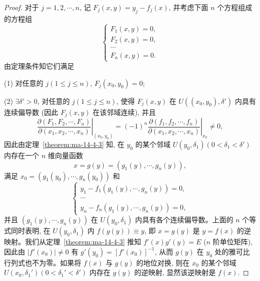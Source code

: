 \begin{proof}
对于 $j=1,2,\cdots,n$, 记 $F_j(x,y)=y_j-f_j(x)$, 并考虑下面 $n$ 个方程组成的方程组
\[
  \begin{cases}
    F_1(x,y)=0,\\
    F_2(x,y)=0,\\
    \cdots\\
    F_n(x,y)=0.
  \end{cases}
\]
由定理条件知它们满足

\noindent (1) 对任意的 $j(1\leqslant j\leqslant n)$, $F_j(x_0,y_0)=0$;

\noindent (2) $\exists\delta'>0$, 对任意的 $j(1\leqslant j\leqslant n)$, 使得 $F_j(x,y)$ 在 $U((x_0,y_0),\delta')$ 内具有连续偏导数 (因此 $F_j(x,y)$ 在该邻域连续), 并且
\[
  \left.
  \frac{\partial(F_1,F_2,\cdots,F_n)}
       {\partial(x_1,x_2,\cdots,x_n)}
  \right|_{(x_0,y_0)}
  =
  (-1)^n
  \left.
  \frac{\partial(f_1,f_2,\cdots,f_n)}
       {\partial(x_1,x_2,\cdots,x_n)}
  \right|_{x_0}
  \ne0,
\]
因此由定理~\ref{theorem:ma-14-4-3} 知, 在 $y_0$ 的某个邻域 $U(y_0,\delta_1)(0<\delta_1<\delta')$ 内存在一个 $n$ 维向量函数
\[
  x=g(y)=(g_1(y),\cdots,g_n(y)),
\]
满足 $x_0=(g_1(y_0),\cdots,g_n(y_0))$ 和
\[
  \begin{cases}
    y_1-f_1(g_1(y),\cdots,g_n(y))=0,\\
    \cdots\\
    y_n-f_n(g_1(y),\cdots,g_n(y))=0,
  \end{cases}
\]
并且 $(g_1(y),\cdots,g_n(y))$ 在 $U(y_0,\delta_1)$ 内具有各个连续偏导数。上面的 $n$ 个等式同时表明, 在 $U(y_0,\delta_1)$ 内 $f(g(y))\equiv y$, 即 $x=g(y)$ 是 $y=f(x)$ 的逆映射。我们从定理~\ref{theorem:ma-14-4-3} 推知 $f'(x)g'(y)=E$ ($n$ 阶单位矩阵), 因此由 $|f'(x_0)|\ne0$ 有 $g'(y_0)=[f'(x_0)]^{-1}$, 从而 $g(y)$ 在 $y_0$ 处的雅可比行列式也不为零。如果将 $f(x)$ 与 $g(y)$ 的地位对换, 则在 $x_0$ 的某个邻域 $U(x_0,\delta_1')(0<\delta_1'<\delta')$ 内存在 $g(y)$ 的逆映射, 显然该逆映射是 $f(x)$.


\end{proof}
